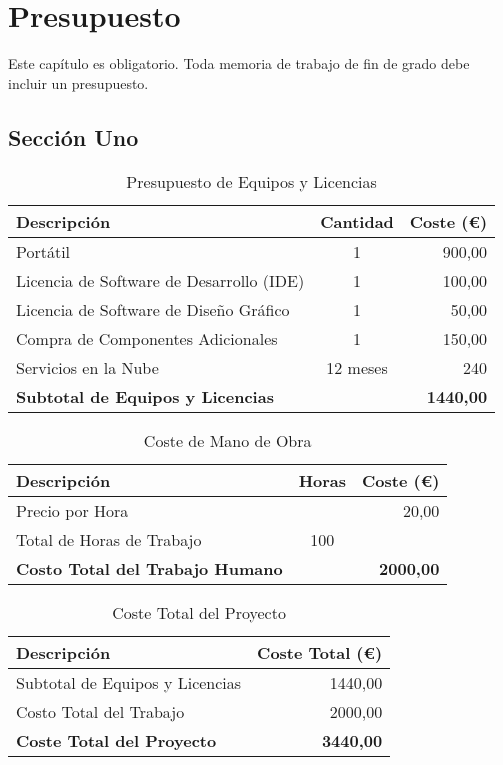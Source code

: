 \chapter{Presupuesto}
\label{ch:presupuesto}

Este capítulo es obligatorio. Toda memoria de trabajo de fin de grado debe incluir un presupuesto.

\section{Sección Uno}

\begin{table}[!ht]
\centering
\caption{Presupuesto de Equipos y Licencias}
\begin{tabularx}{0.8\textwidth}{Xcr}
    \toprule
    \textbf{Descripción} & \textbf{Cantidad} & \textbf{Coste (€)} \\
    \midrule
    Portátil & 1 & 900,00 \\
    Licencia de Software de Desarrollo (IDE) & 1 & 100,00 \\
    Licencia de Software de Diseño Gráfico & 1 & 50,00 \\
    Compra de Componentes Adicionales & 1 & 150,00 \\
    Servicios en la Nube & 12 meses & 240 \\
    \midrule
    \textbf{Subtotal de Equipos y Licencias} & & \textbf{1440,00} \\
    \bottomrule
\end{tabularx}
\end{table}

\begin{table}[!ht]
\centering
\caption{Coste de Mano de Obra}
\begin{tabularx}{0.8\textwidth}{Xcr}
    \toprule
    \textbf{Descripción} & \textbf{Horas} & \textbf{Coste (€)} \\
    \midrule
    Precio por Hora & & 20,00 \\
    Total de Horas de Trabajo & 100 & \\
    \midrule
    \textbf{Costo Total del Trabajo Humano} & & \textbf{2000,00} \\
    \bottomrule
\end{tabularx}
\end{table}

\begin{table}[!ht]
\centering
\caption{Coste Total del Proyecto}
\label{tbl:presupuesto}
\begin{tabularx}{0,8\textwidth}{Xr}
    \toprule
    \textbf{Descripción} & \textbf{Coste Total (€)} \\
    \midrule
    Subtotal de Equipos y Licencias & 1440,00 \\
    Costo Total del Trabajo & 2000,00 \\
    \midrule
    \textbf{Coste Total del Proyecto} & \textbf{3440,00} \\
    \bottomrule
\end{tabularx}
\end{table}
